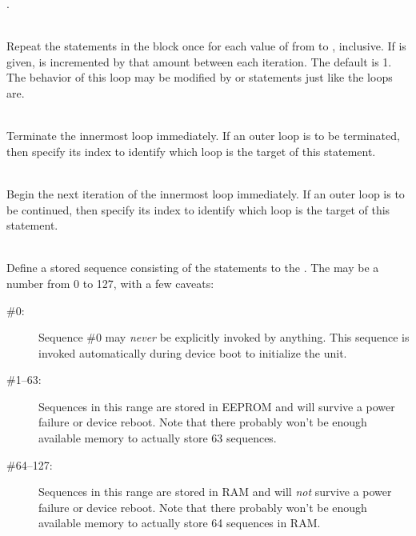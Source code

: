 \begin{list}{}{}
.
\item[{\codetype{FOR }\Var*{var}\codetype{=}\Var*{start}\codetype{ TO }\Var*{end}\codetype{ \textnormal{[}BY }\Var*{step}\codetype{\textnormal{]}: \textnormal{\dots } END}}]\hfill\\
Repeat the statements in the block once for each value of 
from
to 
,
inclusive.
If
is given, 
is incremented by that amount between each iteration.  The default
is 1.
The behavior of this loop may be modified by
or
statements just like the
loops are.
\item[{\codetype{BREAK \textnormal{[}}\Var*{var}\codetype{\textnormal{]}}}]\hfill\\
Terminate the innermost loop immediately.  If an outer loop is to be terminated,
then specify its index 
to identify which loop is the target of this statement.
\item[{\codetype{CONTINUE \textnormal{[}}\Var*{var}\codetype{\textnormal{]}}}]\hfill\\
Begin the next iteration of the innermost loop immediately.  
If an outer loop is to be continued,
then specify its index 
to identify which loop is the target of this statement.
\item[{\codetype{SEQUENCE }\Var*{id}\codetype{\textnormal{[}(}\Var*{var}\codetype{, \textnormal{\dots })\textnormal{]}: \textnormal{\dots } END}}]\hfill\\
Define a stored sequence consisting of the statements to the 
.
The 
may be a number from 0 to 127, with a few caveats:
\begin{description}
\item[{\#0:}]
Sequence \#0 may 
\emph{never}
be explicitly invoked by anything.  This sequence is invoked automatically
during device boot to initialize the unit.
\item[{\#1--63:}]
Sequences in this range are stored in EEPROM and will survive a power failure
or device reboot.  Note that there probably won't be enough available memory
to actually store 63 sequences.
\item[{\#64--127:}]
Sequences in this range are stored in RAM and will 
\emph{not}
survive a power failure
or device reboot.  Note that there probably won't be enough available memory
to actually store 64 sequences in RAM. 
\end{description}
\end{list}


